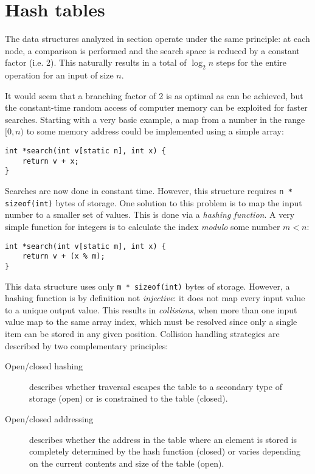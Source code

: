 \section{Hash tables}

The data structures analyzed in section  operate
under the same principle: at each node, a comparison is performed and the search
space is reduced by a constant factor (i.e. 2).  This naturally results in a
total of $\log_2 n$ steps for the entire operation for an input of size $n$.

It would seem that a branching factor of 2 is as optimal as can be achieved, but
the constant-time random access of computer memory can be exploited for faster
searches.  Starting with a very basic example, a map from a number in the range
$[0, n)$ to some memory address could be implemented using a simple array:

\begin{lstlisting}[style=c]
int *search(int v[static n], int x) {
    return v + x;
}
\end{lstlisting}

Searches are now done in constant time.  However, this structure requires
\texttt{n * sizeof(int)} bytes of storage.  One solution to this problem is to
map the input number to a smaller set of values.  This is done via a
\textit{hashing function}.  A very simple function for integers is to calculate
the index \emph{modulo} some number $m < n$:

\begin{lstlisting}[style=c]
int *search(int v[static m], int x) {
    return v + (x % m);
}
\end{lstlisting}

This data structure uses only \texttt{m * sizeof(int)} bytes of storage.
However, a hashing function is by definition not \textit{injective}: it does not
map every input value to a unique output value.  This results in
\textit{collisions}, when more than one input value map to the same array index,
which must be resolved since only a single item can be stored in any given
position.  Collision handling strategies are described by two complementary
principles:

\begin{description}
    \item
        [Open/closed hashing] describes whether traversal escapes the table to a
        secondary type of storage (open) or is constrained to the table
        (closed).
    \item
        [Open/closed addressing] describes whether the address in the table
        where an element is stored is completely determined by the hash function
        (closed) or varies depending on the current contents and size of the
        table (open).
\end{description}

